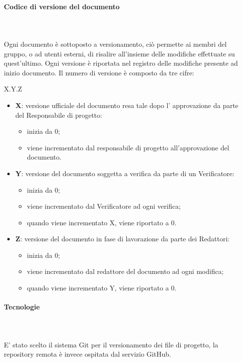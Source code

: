 	\paragraph{Codice di versione del documento} \mbox{}\\ \mbox{}\\
	Ogni documento è sottoposto a versionamento, ciò permette ai membri del gruppo, o ad utenti esterni, di risalire all'insieme delle modifiche effettuate su quest'ultimo. Ogni versione è riportata nel registro delle modifiche presente ad inizio documento.
	Il numero di versione è composto da tre cifre:
	\begin{center}
		X.Y.Z
	\end{center}
	\begin{itemize}
		\item \textbf{X}: versione ufficiale del documento resa tale dopo l' approvazione da parte del Responsabile di progetto:
		\begin{itemize}
			\item inizia da 0;
			\item viene incrementato dal responsabile di progetto all'approvazione del documento.
		\end{itemize}
		\item \textbf{Y}: versione del documento soggetta a verifica da parte di un Verificatore:
		\begin{itemize}
			\item inizia da 0;
			\item viene incrementato dal Verificatore ad ogni verifica;
			\item quando viene incrementato X, viene riportato a 0.
		\end{itemize}
		\item \textbf{Z}: versione del documento in fase di lavorazione da parte dei Redattori:
		\begin{itemize}
			\item inizia da 0;
			\item viene incrementato dal redattore del documento ad ogni modifica;
			\item quando viene incrementato Y, viene riportato a 0.
		\end{itemize}			
	\end{itemize}
	\paragraph{Tecnologie} \mbox{}\\ \mbox{}\\
	E' stato scelto il sistema Git per il versionamento dei file di progetto, la repository remota è invece ospitata dal servizio GitHub. 
